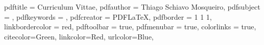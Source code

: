 \usepackage{marginnote}
\usepackage{ragged2e}
\usepackage[english]{babel}
\usepackage[numbers,super,sort&compress]{natbib}
\usepackage{nopageno}
\usepackage{setspace}
\usepackage{pdfpages}
\usepackage{graphicx}
\usepackage{indentfirst}
\usepackage{amsfonts,amsmath,amscd,amstext,amssymb,bezier}
\usepackage[symbol]{footmisc}
\usepackage{fancyhdr}
\usepackage{tikz}
\usepackage{pgf}


\usepackage[colorlinks, hyperindex, breaklinks, backref=page]{hyperref}
\hypersetup
{
	pdftitle = {Curriculum Vittae},
    pdfauthor = {Thiago Schiavo Mosqueiro},
    pdfsubject = {},
    pdfkeywords = {},
    pdfcreator = {PDFLaTeX},
    pdfborder =  {1 1 1},
    linkbordercolor = red,
    pdftoolbar = true,
    pdfmenubar = true,
    colorlinks = true,
    citecolor=Green,
    linkcolor=Red,
    urlcolor=Blue,
}
